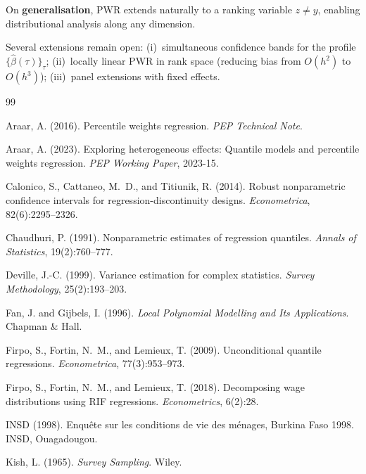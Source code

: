 \documentclass[12pt,a4paper]{article}
\theoremstyle{definition}
\newcommand{\hbeta}{\hat{\beta}}
\begin{document}
On \textbf{generalisation}, PWR extends naturally to a ranking variable
$z\neq y$, enabling distributional analysis along any dimension.

Several extensions remain open: (i)~simultaneous confidence bands for
the profile $\{\hbeta(\tau)\}_\tau$; (ii)~locally linear PWR in rank
space (reducing bias from $O(h^2)$ to $O(h^3)$); (iii)~panel extensions
with fixed effects.


\begin{thebibliography}{99}

Araar, A. (2016). Percentile weights regression. \emph{PEP Technical Note}.

Araar, A. (2023). Exploring heterogeneous effects: Quantile models and
percentile weights regression. \emph{PEP Working Paper}, 2023-15.

Calonico, S., Cattaneo, M.~D., and Titiunik, R. (2014). Robust
nonparametric confidence intervals for regression-discontinuity designs.
\emph{Econometrica}, 82(6):2295--2326.

Chaudhuri, P. (1991). Nonparametric estimates of regression quantiles.
\emph{Annals of Statistics}, 19(2):760--777.

Deville, J.-C. (1999). Variance estimation for complex statistics.
\emph{Survey Methodology}, 25(2):193--203.

Fan, J. and Gijbels, I. (1996). \emph{Local Polynomial Modelling and Its
Applications}. Chapman \& Hall.

Firpo, S., Fortin, N.~M., and Lemieux, T. (2009). Unconditional quantile
regressions. \emph{Econometrica}, 77(3):953--973.

Firpo, S., Fortin, N.~M., and Lemieux, T. (2018). Decomposing wage
distributions using RIF regressions. \emph{Econometrics}, 6(2):28.

INSD (1998). Enqu\^{e}te sur les conditions de vie des m\'{e}nages,
Burkina Faso 1998. INSD, Ouagadougou.

Kish, L. (1965). \emph{Survey Sampling}. Wiley.


\end{thebibliography}
\end{document}
